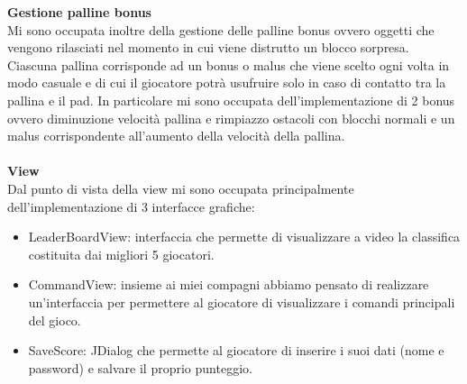 \documentclass[a4paper,12pt]{report}
\begin{document}
\textbf{Gestione palline bonus}\\
Mi sono occupata inoltre della gestione delle palline bonus ovvero oggetti che vengono rilasciati nel momento in cui viene distrutto un blocco sorpresa.
Ciascuna pallina corrisponde ad un bonus o malus che viene scelto ogni volta in modo casuale e di cui il giocatore potrà usufruire solo in caso di contatto tra la pallina e il pad.
In particolare mi sono occupata dell'implementazione di 2 bonus ovvero diminuzione velocità pallina e rimpiazzo ostacoli con blocchi normali e un malus corrispondente all'aumento della velocità della pallina.\\\\

\textbf{View}\\
Dal punto di vista della view mi sono occupata principalmente dell'implementazione di 3 interfacce grafiche:
\begin{itemize}
    \item LeaderBoardView: interfaccia che permette di visualizzare a video la classifica costituita dai migliori 5 giocatori.
    \item CommandView: insieme ai miei compagni abbiamo pensato di realizzare un'interfaccia per permettere al giocatore di visualizzare i comandi principali del gioco.
    \item SaveScore: JDialog che permette al giocatore di inserire i suoi dati (nome e password) e salvare il proprio punteggio.
\end{itemize}
\end{document}
